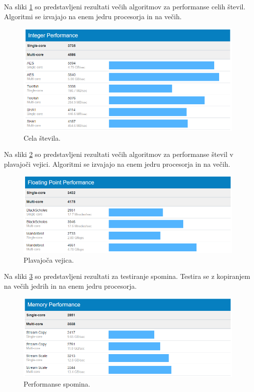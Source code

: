 Na sliki \ref{fig:3_1_geekbench1} so predstavljeni rezultati večih algoritmov za performanse celih števil. Algoritmi se izvajajo na enem jedru procesorja in na večih.
\begin{figure}[H]
    \centering
    \includegraphics[scale=0.5]{Img/3_geekbench1.png}
    \caption{Cela števila.}
    \label{fig:3_1_geekbench1}
\end{figure} Na sliki \ref{fig:3_2_geekbench2} so predstavljeni rezultati večih algoritmov za performanse števil v plavajoči vejici. Algoritmi se izvajajo na enem jedru procesorja in na večih.
\begin{figure}[H]
    \centering
    \includegraphics[scale=0.5]{Img/3_geekbench2.png}
    \caption{Plavajoča vejica.}
    \label{fig:3_2_geekbench2}
\end{figure} Na sliki \ref{fig:3_3_geekbench3} so predstavljeni rezultati za testiranje spomina. Testira se z kopiranjem na večih jedrih in na enem jedru procesorja.
\begin{figure}[H]
    \centering
    \includegraphics[scale=0.5]{Img/3_geekbench3.png}
    \caption{Performanse spomina.}
    \label{fig:3_3_geekbench3}
\end{figure}

